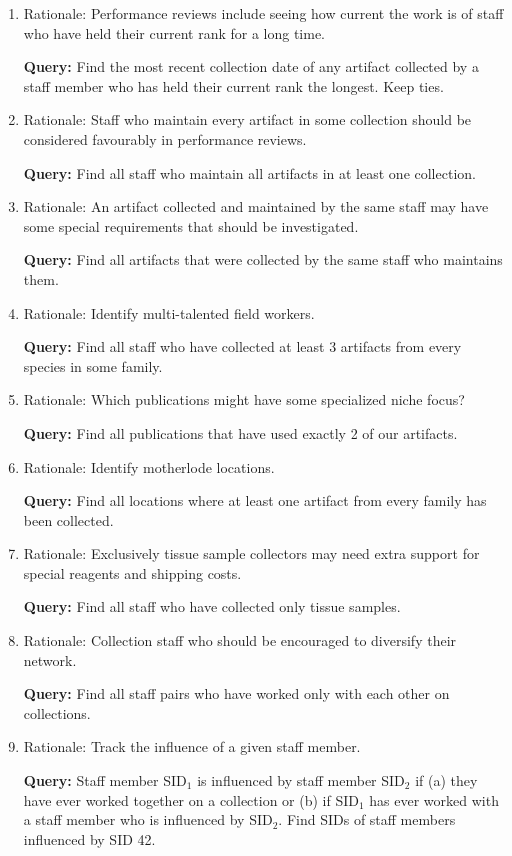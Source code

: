 \documentclass[boldsans]{article}
\begin{document}
\begin{enumerate}
\item Rationale: Performance reviews include seeing how current the work
  is of staff who have held their current rank for a long time.

  \textbf{Query:} Find the most recent collection date of any artifact
  collected by a staff member who has held their current rank the
  longest.  Keep ties.
  
\item Rationale: Staff who maintain every artifact in some collection
  should be considered favourably in performance reviews.

  \textbf{Query:} Find all staff who maintain all artifacts in at
  least one collection.

\item Rationale: An artifact collected and maintained by the same staff
  may have some special requirements that should be investigated.

  \textbf{Query:} Find all artifacts that were collected by the same
  staff who maintains them.

\item Rationale: Identify multi-talented field workers.

  \textbf{Query:} Find all staff who have collected at least 3
  artifacts from every species in some family.

\item Rationale: Which publications might have some specialized niche
  focus?

  \textbf{Query:} Find all publications that have used exactly 2 of
  our artifacts.

\item Rationale: Identify motherlode locations.

  \textbf{Query:} Find all locations where at least one artifact from
  every family has been collected.

\item Rationale: Exclusively tissue sample collectors may need extra
  support for special reagents and shipping costs.

  \textbf{Query:} Find all staff who have collected only tissue
  samples.

\item Rationale: Collection staff who should be encouraged to
  diversify their network.

  \textbf{Query:} Find all staff pairs who have worked only with each
  other on collections.

\item Rationale: Track the influence of a given staff member.

  \textbf{Query:} Staff member SID$_1$ is influenced by staff member
  SID$_2$ if (a) they have ever worked together on a collection or (b)
  if SID$_1$ has ever worked with a staff member who is influenced by
  SID$_2$.  Find SIDs of staff members influenced by SID 42.
\end{enumerate}
\end{document}
